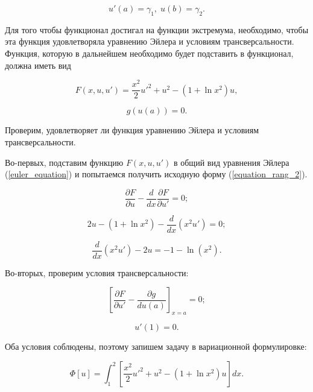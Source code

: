 \documentclass{article}
\begin{document}
\begin{displaymath}
	u'(a) = \gamma_{1}, \; u(b) = \gamma_{2}.
\end{displaymath}

Для того чтобы функционал достигал на функции экстремума, необходимо, чтобы эта функция удовлетворяла уравнению Эйлера и условиям трансверсальности. Функция, которую в дальнейшем необходимо будет подставить в функционал, должна иметь вид

\begin{displaymath}
	F(x, u, u') = \frac{x^2}{2}u'^2 + u^2 - (1+\ln{x^2})u,
\end{displaymath}

\begin{displaymath}
	g(u(a)) = 0.
\end{displaymath}

\noindent Проверим, удовлетворяет ли функция уравнению Эйлера и условиям трансверсальности. 

Во-первых, подставим функцию $F(x, u, u')$ в общий вид уравнения Эйлера (\ref{euler_equation}) и попытаемся получить исходную форму (\ref{equation_rang_2}).

\begin{displaymath}
	\frac{\partial F}{\partial u} - \frac{d}{dx}\frac{\partial F}{\partial u'} = 0;
\end{displaymath}

\begin{displaymath}
	2u - (1 + \ln{x^2}) - \frac{d}{dx}(x^2 u') = 0;
\end{displaymath}

\begin{displaymath}
	\frac{d}{dx}(x^2 u') - 2u = -1 - \ln(x^2).
\end{displaymath}

\noindent Во-вторых, проверим условия трансверсальности:

\begin{displaymath}
	\left[ \frac{\partial F}{\partial u'} - \frac{\partial g}{du(a)} \right]_{x=a} = 0;
\end{displaymath}

\begin{displaymath}
	u'(1) = 0.
\end{displaymath}

\noindent Оба условия соблюдены, поэтому запишем задачу в вариационной формулировке:

\begin{equation}\label{equation_functional_rank_2}
	\Phi[u] = \int_{1}^{2} \left[ \frac{x^2}{2}u'^2 + u^2 - (1 + \ln{x^2})u \right] dx.
\end{equation}
\end{document}
